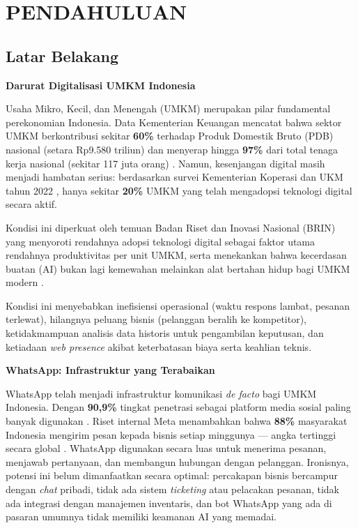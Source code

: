 \documentclass[12pt,a4paper,oneside]{article}
\newcommand{\bab}[1]{%
    \newpage
    \section{#1}%
}
\newcommand{\sub}[1]{%
    \subsection{#1}%
}
\begin{document}
\listoffigures
\newpage

\bab{PENDAHULUAN}

\sub{Latar Belakang}

\textbf{Darurat Digitalisasi UMKM Indonesia}

Usaha Mikro, Kecil, dan Menengah (UMKM) merupakan pilar fundamental perekonomian Indonesia. Data Kementerian Keuangan mencatat bahwa sektor UMKM berkontribusi sekitar \textbf{60\%} terhadap Produk Domestik Bruto (PDB) nasional (setara Rp9.580 triliun) dan menyerap hingga \textbf{97\%} dari total tenaga kerja nasional (sekitar 117 juta orang) \cite{idxchannel2025}. Namun, kesenjangan digital masih menjadi hambatan serius: berdasarkan survei Kementerian Koperasi dan UKM tahun 2022 \cite{kemkop2022survei}, hanya sekitar \textbf{20\%} UMKM yang telah mengadopsi teknologi digital secara aktif.

Kondisi ini diperkuat oleh temuan Badan Riset dan Inovasi Nasional (BRIN) yang menyoroti rendahnya adopsi teknologi digital sebagai faktor utama rendahnya produktivitas per unit UMKM, serta menekankan bahwa kecerdasan buatan (AI) bukan lagi kemewahan melainkan alat bertahan hidup bagi UMKM modern \cite{brin2025}.

Kondisi ini menyebabkan inefisiensi operasional (waktu respons lambat, pesanan terlewat), hilangnya peluang bisnis (pelanggan beralih ke kompetitor), ketidakmampuan analisis data historis untuk pengambilan keputusan, dan ketiadaan \textit{web presence} akibat keterbatasan biaya serta keahlian teknis.

\textbf{WhatsApp: Infrastruktur yang Terabaikan}

WhatsApp telah menjadi infrastruktur komunikasi \textit{de facto} bagi UMKM Indonesia. Dengan \textbf{90,9\%} tingkat penetrasi sebagai platform media sosial paling banyak digunakan \cite{wearesocial2024}. Riset internal Meta menambahkan bahwa \textbf{88\%} masyarakat Indonesia mengirim pesan kepada bisnis setiap minggunya — angka tertinggi secara global \cite{meta2025}. WhatsApp digunakan secara luas untuk menerima pesanan, menjawab pertanyaan, dan membangun hubungan dengan pelanggan. Ironisnya, potensi ini belum dimanfaatkan secara optimal: percakapan bisnis bercampur dengan \textit{chat} pribadi, tidak ada sistem \textit{ticketing} atau pelacakan pesanan, tidak ada integrasi dengan manajemen inventaris, dan bot WhatsApp yang ada di pasaran umumnya tidak memiliki keamanan AI yang memadai.
\end{document}
